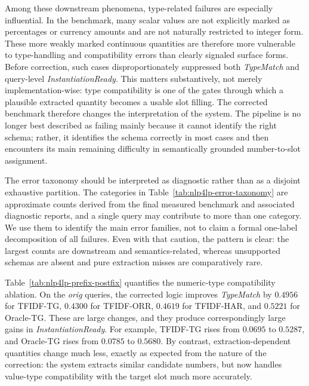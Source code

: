 \documentclass[pdflatex,sn-basic,Numbered]{sn-jnl}
\begin{document}
Among these downstream phenomena, type-related failures are especially influential. In the benchmark, many scalar values are not explicitly marked as percentages or currency amounts and are not naturally restricted to integer form. These more weakly marked continuous quantities are therefore more vulnerable to type-handling and compatibility errors than clearly signaled surface forms. Before correction, such cases disproportionately suppressed both \textit{TypeMatch} and query-level \textit{InstantiationReady}. This matters substantively, not merely implementation-wise: type compatibility is one of the gates through which a plausible extracted quantity becomes a usable slot filling. The corrected benchmark therefore changes the interpretation of the system. The pipeline is no longer best described as failing mainly because it cannot identify the right schema; rather, it identifies the schema correctly in most cases and then encounters its main remaining difficulty in semantically grounded number-to-slot assignment.

The error taxonomy should be interpreted as diagnostic rather than as a disjoint exhaustive partition. The categories in Table~\ref{tab:nlp4lp-error-taxonomy} are approximate counts derived from the final measured benchmark and associated diagnostic reports, and a single query may contribute to more than one category. We use them to identify the main error families, not to claim a formal one-label decomposition of all failures. Even with that caution, the pattern is clear: the largest counts are downstream and semantics-related, whereas unsupported schemas are absent and pure extraction misses are comparatively rare.

Table~\ref{tab:nlp4lp-prefix-postfix} quantifies the numeric-type compatibility ablation. On the \emph{orig} queries, the corrected logic improves \textit{TypeMatch} by $0.4956$ for TFIDF-TG, $0.4300$ for TFIDF-ORR, $0.4619$ for TFIDF-HAR, and $0.5221$ for Oracle-TG. These are large changes, and they produce correspondingly large gains in \textit{InstantiationReady}. For example, TFIDF-TG rises from $0.0695$ to $0.5287$, and Oracle-TG rises from $0.0785$ to $0.5680$. By contrast, extraction-dependent quantities change much less, exactly as expected from the nature of the correction: the system extracts similar candidate numbers, but now handles value-type compatibility with the target slot much more accurately.
\end{document}
